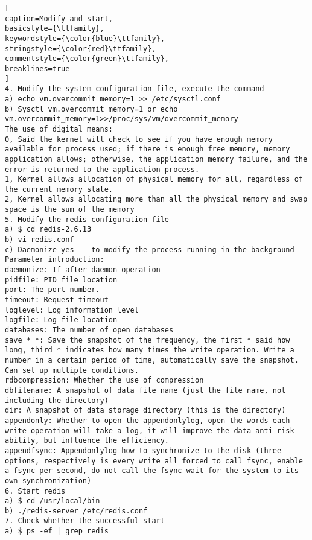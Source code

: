 \begin{lstlisting}[
caption=Modify and start,
basicstyle={\ttfamily},
keywordstyle={\color{blue}\ttfamily},
stringstyle={\color{red}\ttfamily},
commentstyle={\color{green}\ttfamily},
breaklines=true
]
4. Modify the system configuration file, execute the command
a) echo vm.overcommit_memory=1 >> /etc/sysctl.conf
b) Sysctl vm.overcommit_memory=1 or echo vm.overcommit_memory=1>>/proc/sys/vm/overcommit_memory
The use of digital means:
0, Said the kernel will check to see if you have enough memory available for process used; if there is enough free memory, memory application allows; otherwise, the application memory failure, and the error is returned to the application process.
1, Kernel allows allocation of physical memory for all, regardless of the current memory state.
2, Kernel allows allocating more than all the physical memory and swap space is the sum of the memory
5. Modify the redis configuration file
a) $ cd redis-2.6.13
b) vi redis.conf
c) Daemonize yes--- to modify the process running in the background
Parameter introduction:
daemonize: If after daemon operation
pidfile: PID file location
port: The port number.
timeout: Request timeout
loglevel: Log information level
logfile: Log file location
databases: The number of open databases
save * *: Save the snapshot of the frequency, the first * said how long, third * indicates how many times the write operation. Write a number in a certain period of time, automatically save the snapshot. Can set up multiple conditions.
rdbcompression: Whether the use of compression
dbfilename: A snapshot of data file name (just the file name, not including the directory)
dir: A snapshot of data storage directory (this is the directory)
appendonly: Whether to open the appendonlylog, open the words each write operation will take a log, it will improve the data anti risk ability, but influence the efficiency.
appendfsync: Appendonlylog how to synchronize to the disk (three options, respectively is every write all forced to call fsync, enable a fsync per second, do not call the fsync wait for the system to its own synchronization)
6. Start redis
a) $ cd /usr/local/bin
b) ./redis-server /etc/redis.conf
7. Check whether the successful start
a) $ ps -ef | grep redis
\end{lstlisting}
